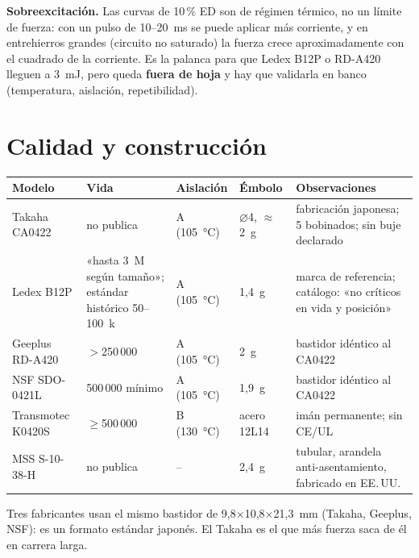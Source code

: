 \documentclass[11pt,a4paper]{article}
\begin{document}
\textbf{Sobreexcitación.} Las curvas de 10\,\% ED son de régimen térmico, no un límite de fuerza: con un pulso
de 10--20~ms se puede aplicar más corriente, y en entrehierros grandes (circuito no saturado) la fuerza crece
aproximadamente con el cuadrado de la corriente. Es la palanca para que Ledex B12P o RD-A420 lleguen a 3~mJ,
pero queda \textbf{fuera de hoja} y hay que validarla en banco (temperatura, aislación, repetibilidad).

\section{Calidad y construcción}
\begin{table}[H]\centering\footnotesize\setlength{\tabcolsep}{3pt}
\begin{tabular}{l p{3.0cm} p{1.9cm} p{1.9cm} p{4.9cm}}
\toprule
Modelo & Vida & Aislación & Émbolo & Observaciones\\
\midrule
Takaha CA0422 & no publica & A (105~°C) & $\varnothing$4, $\approx$2~g & fabricación japonesa; 5 bobinados; sin buje declarado\\
Ledex B12P & «hasta 3~M según tamaño»; estándar histórico 50--100~k & A (105~°C) & 1,4~g & marca de referencia; catálogo: «no críticos en vida y posición»\\
Geeplus RD-A420 & $>$250\,000 & A (105~°C) & 2~g & bastidor idéntico al CA0422\\
NSF SDO-0421L & 500\,000 mínimo & A (105~°C) & 1,9~g & bastidor idéntico al CA0422\\
Transmotec K0420S & $\geq$500\,000 & B (130~°C) & acero 12L14 & imán permanente; sin CE/UL\\
MSS S-10-38-H & no publica & -- & 2,4~g & tubular, arandela anti-asentamiento, fabricado en EE.\,UU.\\
\bottomrule
\end{tabular}
\end{table}
Tres fabricantes usan el mismo bastidor de 9,8$\times$10,8$\times$21,3~mm (Takaha, Geeplus, NSF): es un formato
estándar japonés. El Takaha es el que más fuerza saca de él en carrera larga.

\end{document}
